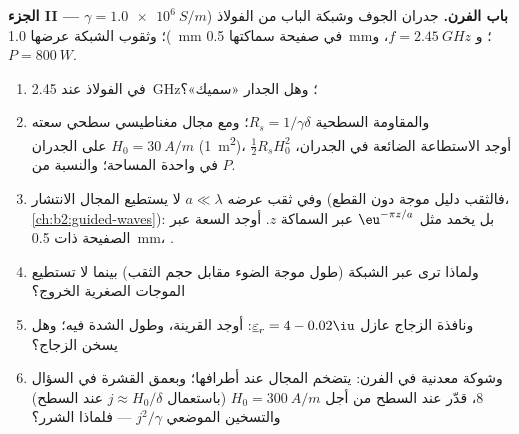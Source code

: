 \begin{problem}
\medskip
\noindent\textbf{الجزء II --- باب الفرن.}
جدران الجوف وشبكة الباب من الفولاذ ($\gamma = \qty{1.0e6}{S/m}$)؛
وثقوب الشبكة عرضها \qty{1.0}{mm} في صفيحة سماكتها \qty{0.5}{mm}؛
و $f = \qty{2.45}{GHz}$، و $P = \qty{800}{W}$.
\begin{enumerate}[resume]
  \item {} في الفولاذ عند \qty{2.45}{GHz}؛ وهل الجدار «سميك»؟
  \item والمقاومة السطحية $R_s = 1/\gamma\delta$؛ ومع مجال مغناطيسي
        سطحي سعته $H_0 = \qty{30}{A/m}$ على الجدران (\qty{1}{m^2})،
        أوجد الاستطاعة الضائعة في الجدران، $\tfrac12R_sH_0^2$ في واحدة المساحة؛ والنسبة
        من $P$.
  \item وفي ثقب عرضه $a \ll \lambda$ لا يستطيع المجال الانتشار (فالثقب
        دليل موجة دون القطع، \cref{ch:b2:guided-waves}):
        بل يخمد مثل $\eu^{-\pi z/a}$ عبر السماكة $z$. أوجد 
        السعة عبر الصفيحة ذات \qty{0.5}{mm}، .
  \item ولماذا ترى عبر الشبكة (طول موجة الضوء
        مقابل حجم الثقب) بينما لا تستطيع الموجات الصغرية الخروج؟
  \item ونافذة الزجاج عازل $\underline\varepsilon_r = 4 - 0.02\iu$:
        أوجد القرينة، وطول  الشدة فيه؛ وهل يسخن
        الزجاج؟
  \item وشوكة معدنية في الفرن: يتضخم المجال عند أطرافها؛
        وبعمق القشرة في السؤال 8، قدّر 
        عند السطح من أجل $H_0 = \qty{300}{A/m}$ (باستعمال $j \approx H_0/\delta$
        عند السطح) والتسخين الموضعي $j^2/\gamma$ --- فلماذا الشرر؟
\end{enumerate}


\end{problem}
